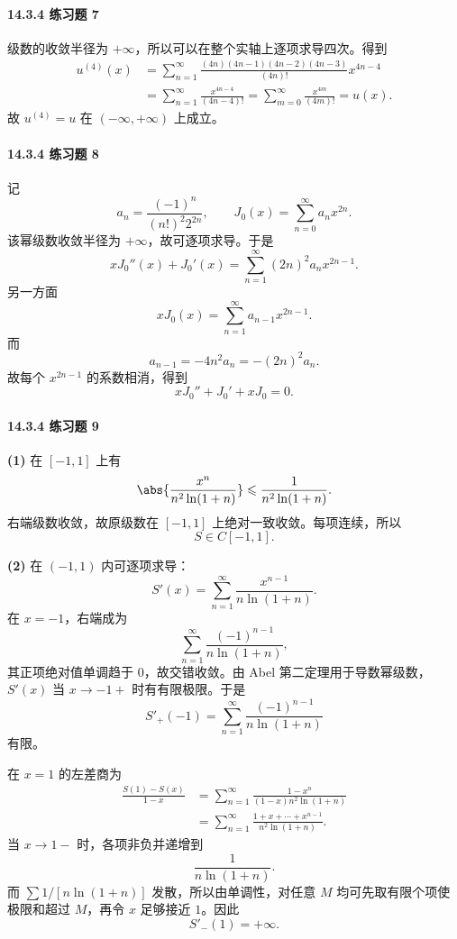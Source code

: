 \paragraph{14.3.4 练习题 7}
\begin{xsolution}
级数的收敛半径为 $+\infty$，所以可以在整个实轴上逐项求导四次。得到
\[
\begin{aligned}
  u^{(4)}(x)
  &=\sum_{n=1}^{\infty}\frac{(4n)(4n-1)(4n-2)(4n-3)}{(4n)!}x^{4n-4}\\
  &=\sum_{n=1}^{\infty}\frac{x^{4n-4}}{(4n-4)!}
  =\sum_{m=0}^{\infty}\frac{x^{4m}}{(4m)!}=u(x).
\end{aligned}
\]
故 $u^{(4)}=u$ 在 $(-\infty,+\infty)$ 上成立。
\end{xsolution}

\paragraph{14.3.4 练习题 8}
\begin{xsolution}
记
\[
  a_n=\frac{(-1)^n}{(n!)^2 2^{2n}},
  \qquad J_0(x)=\sum_{n=0}^{\infty}a_nx^{2n}.
\]
该幂级数收敛半径为 $+\infty$，故可逐项求导。于是
\[
  xJ_0''(x)+J_0'(x)
  =\sum_{n=1}^{\infty}(2n)^2a_nx^{2n-1}.
\]
另一方面
\[
  xJ_0(x)=\sum_{n=1}^{\infty}a_{n-1}x^{2n-1}.
\]
而
\[
  a_{n-1}=-4n^2a_n=-(2n)^2a_n.
\]
故每个 $x^{2n-1}$ 的系数相消，得到
\[
  xJ_0''+J_0'+xJ_0=0.
\]
\end{xsolution}

\paragraph{14.3.4 练习题 9}
\begin{xsolution}
\textbf{(1)} 在 $[-1,1]$ 上有
\[
  \abs{\frac{x^n}{n^2\ln(1+n)}}
  \leqslant\frac1{n^2\ln(1+n)}.
\]
右端级数收敛，故原级数在 $[-1,1]$ 上绝对一致收敛。每项连续，所以
\[
  S\in C[-1,1].
\]

\textbf{(2)} 在 $(-1,1)$ 内可逐项求导：
\[
  S'(x)=\sum_{n=1}^{\infty}\frac{x^{n-1}}{n\ln(1+n)}.
\]
在 $x=-1$，右端成为
\[
  \sum_{n=1}^{\infty}\frac{(-1)^{n-1}}{n\ln(1+n)},
\]
其正项绝对值单调趋于 $0$，故交错收敛。由 Abel 第二定理用于导数幂级数，$S'(x)$ 当 $x\to-1+$ 时有有限极限。于是
\[
  S'_+(-1)=\sum_{n=1}^{\infty}\frac{(-1)^{n-1}}{n\ln(1+n)}
\]
有限。

在 $x=1$ 的左差商为
\[
\begin{aligned}
  \frac{S(1)-S(x)}{1-x}
  &=\sum_{n=1}^{\infty}
    \frac{1-x^n}{(1-x)n^2\ln(1+n)}\\
  &=\sum_{n=1}^{\infty}
    \frac{1+x+\cdots+x^{n-1}}{n^2\ln(1+n)}.
\end{aligned}
\]
当 $x\to1-$ 时，各项非负并递增到
\[
  \frac1{n\ln(1+n)}.
\]
而 $\sum1/[n\ln(1+n)]$ 发散，所以由单调性，对任意 $M$ 均可先取有限个项使极限和超过 $M$，再令 $x$ 足够接近 $1$。因此
\[
  S'_-(1)=+\infty.
\]
\end{xsolution}


